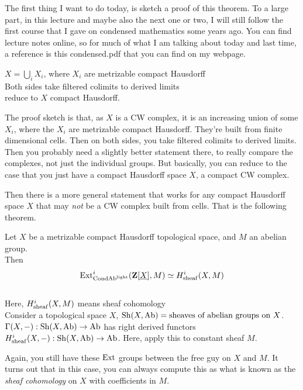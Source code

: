 The first thing I want to do today, is sketch a proof of this theorem. To a large part, in this lecture and maybe also the next one or two, I will still follow the first course that I gave on condensed mathematics some years ago. You can find lecture notes online, so for much of what I am talking about today and last time, a reference is this condensed.pdf that you can find on my webpage.

\begin{sketch}
$ X = \bigcup_i X_i $, where $X_i$ are metrizable compact Hausdorff \\
Both sides take filtered colimits to derived limits\\
reduce to $X$ compact Hausdorff. 
\end{sketch}
The proof sketch is that, as $X$ is a CW complex, it is an increasing union of some $X_i$, where the $X_i$ are metrizable compact Hausdorff. They're built from finite dimensional cells. 
Then on both sides, you take filtered colimits to derived limits. 
Then you probably need a slightly better statement there, to really compare the complexes, not just the individual groups. But basically, you can reduce to the case that you just have a compact Hausdorff space $X$, a compact CW complex.

Then there is a more general statement that works for any compact Hausdorff space $X$ that may \emph{not} be a CW complex built from cells. 
That is the following theorem. 

\begin{theorem}
Let $X$ be a metrizable compact Hausdorff topological space, and $M$ an abelian group. \\
Then 
\begin{align*}
\operatorname{Ext}^i_{\mathrm{Cond}\mathrm{Ab}^{\mathrm{light}}}(\mathbf Z[\underline{X}], M) \simeq H^i_{\mathrm{sheaf}}(X,M)
\end{align*}
\\
Here, $H^i_{\mathrm{sheaf}}(X,M)$ means sheaf cohomology \\
Consider a topological space $X$, $\operatorname{Sh}(X, \mathrm{Ab}) = \text{sheaves of abelian groups on $X$}$. \\
$\Gamma(X,-): \operatorname{Sh}(X, \mathrm{Ab}) \to \mathrm{Ab}$
has right derived functors \\
$H^i_{\mathrm{sheaf}}(X,-): \operatorname{Sh}(X, \mathrm{Ab}) \to \mathrm{Ab}$.
Here, apply this to constant sheaf $M$.
\end{theorem}

Again, you still have these $\operatorname{Ext}$ groups between the free guy on $X$ and $M$. 
It turns out that in this case, you can always compute this as what is known as the \emph{sheaf cohomology} on $X$ with coefficients in $M$.

